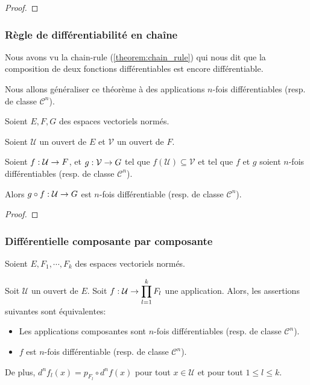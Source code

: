 \ifdefined\outputproof
\begin{proof}

\end{proof}
\fi

\subsubsection{Règle de différentiabilité en chaîne}

Nous avons vu la chain-rule (\ref{theorem:chain_rule}) qui nous dit que la
composition de deux fonctions différentiables est encore différentiable.

Nous allons généraliser ce théorème à des applications $n$-fois différentiables
(resp. de classe $\mathcal{C}^{n}$).

\begin{proposition}
	Soient $E, F, G$ des espaces vectoriels normés.

	Soient $\mathcal{U}$ un ouvert de $E$ et $\mathcal{V}$ un ouvert de $F$.

	Soient $f : \mathcal{U} \rightarrow F$, et $g : \mathcal{V} \rightarrow G$
	tel que $f(\mathcal{U}) \subseteq \mathcal{V}$ et tel que $f$ et $g$ soient
	$n$-fois différentiables (resp. de classe $\mathcal{C}^{n}$).

	Alors $g \circ f : \mathcal{U} \rightarrow G$ est $n$-fois différentiable
	(resp. de classe $\mathcal{C}^{n}$).
\end{proposition}

\ifdefined\outputproof
\begin{proof}

\end{proof}
\fi

\subsubsection{Différentielle composante par composante}

Soient $E, F_{1}, \cdots, F_{k}$ des espaces vectoriels normés.

\begin{proposition}
	Soit $\mathcal{U}$ un ouvert de $E$.
	Soit $f : \mathcal{U} \rightarrow \displaystyle \prod_{l = 1}^{k} F_{l}$ une
	application.
	Alors, les assertions suivantes sont équivalentes:

	\begin{itemize}
		\item Les applications composantes sont $n$-fois différentiables (resp.
			de classe $\mathcal{C}^{n}$).
		\item $f$ est $n$-fois différentiable (resp. de classe
			$\mathcal{C}^{n}$).
	\end{itemize}

	De plus, $d^{n}f_{l}(x) = p_{F_{l}} \circ d^{n} f(x)$ pour tout $x \in
	\mathcal{U}$ et pour tout $1 \leq l \leq k$.
\end{proposition}

